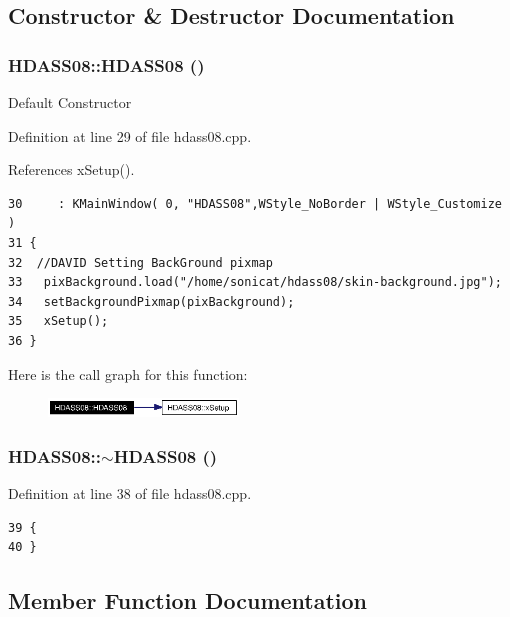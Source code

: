 \subsection{Constructor \& Destructor Documentation}
\subsubsection{\setlength{\rightskip}{0pt plus 5cm}HDASS08::HDASS08 ()}\label{classHDASS08_HDASS08a0}


Default Constructor 

Definition at line 29 of file hdass08.cpp.

References x\-Setup().



\footnotesize\begin{verbatim}30     : KMainWindow( 0, "HDASS08",WStyle_NoBorder | WStyle_Customize  )
31 {
32  //DAVID Setting BackGround pixmap
33   pixBackground.load("/home/sonicat/hdass08/skin-background.jpg");
34   setBackgroundPixmap(pixBackground);
35   xSetup();
36 }
\end{verbatim}\normalsize 


Here is the call graph for this function:\begin{figure}[H]
\begin{center}
\leavevmode
\includegraphics[width=143pt]{classHDASS08_HDASS08a0_cgraph}
\end{center}
\end{figure}
\subsubsection{\setlength{\rightskip}{0pt plus 5cm}HDASS08::$\sim${\bf HDASS08} ()\hspace{0.3cm}{\tt  [virtual]}}\label{classHDASS08_HDASS08a2}




Definition at line 38 of file hdass08.cpp.



\footnotesize\begin{verbatim}39 {
40 }
\end{verbatim}\normalsize 


\subsection{Member Function Documentation}
